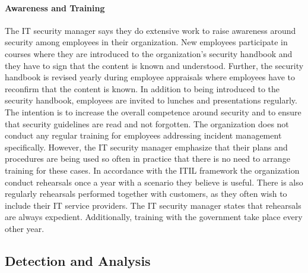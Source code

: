 \paragraph{Awareness and Training}
The IT security manager says they do extensive work to raise awareness around security among employees in their organization. New employees participate in courses where they are introduced to the organization's security handbook and they have to sign that the content is known and understood. Further, the security handbook is revised yearly during employee appraisals where employees have to reconfirm that the content is known.  
In addition to being introduced to the security handbook, employees are invited to lunches and presentations regularly. The intention is to increase the overall competence around security and to ensure that security guidelines are read and not forgotten. 
The organization does not conduct any regular training for employees addressing incident management specifically. However, the IT security manager emphasize that their plans and procedures are being used so often in practice that there is no need to arrange training for these cases. 
In accordance with the ITIL framework the organization conduct rehearsals once a year with a scenario they believe is useful. There is also regularly rehearsals performed together with customers, as they often wish to include their IT service providers. The IT security manager states that rehearsals are always expedient. Additionally, training with the government take place every other year. 
\subsection{Detection and Analysis}
